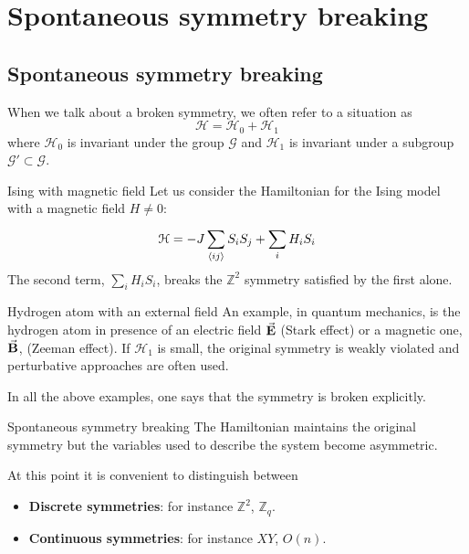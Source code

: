 \documentclass[../../Main/Main.tex]{subfiles}
\begin{document}
\chapter{Spontaneous symmetry breaking}

\section{Spontaneous symmetry breaking}

When we talk about a broken symmetry, we often refer to a situation as
\begin{equation*}
  \mathcal{H} = \mathcal{H}_0 + \mathcal{H}_1
\end{equation*}
where \( \mathcal{H}_0 \)  is invariant under the group \( \mathcal{G} \) and \( \mathcal{H}_1 \) is invariant under a subgroup \( \mathcal{G}' \subset  \mathcal{G}\).

\begin{example}{Ising with magnetic field}{}
  Let us consider the Hamiltonian for the Ising model with a magnetic field \( H \neq 0 \):
\begin{equation*}
  \mathcal{H} = -J \sum_{\expval{ij} }^{} S_i S_j + \sum_{i}^{} H_i S_i
\end{equation*}
The second term, \( \sum_{i}^{}  H_i S_i \), breaks the \( \mathbb{Z}^2 \) symmetry satisfied by the first alone.
\end{example}

\begin{example}{Hydrogen atom with an external field}{}
  An example, in quantum mechanics, is the hydrogen atom in presence of an electric field \( \va{E} \) (Stark effect) or a magnetic one, \( \va{B} \), (Zeeman effect). If \( \mathcal{H}_1 \) is small, the original symmetry is weakly violated and perturbative approaches are often used.
\end{example}

In all the above examples, one says that the symmetry is broken explicitly.

\begin{definition}{Spontaneous symmetry breaking}{}
The Hamiltonian maintains the original symmetry but the variables used to describe the system become asymmetric.
\end{definition}

At this point it is convenient to distinguish between
\begin{itemize}
\item \textbf{Discrete symmetries}: for instance \( \mathbb{Z}^2 \), \( \mathbb{Z}_q \).
\item \textbf{Continuous symmetries}: for instance \( XY \), \( O(n) \).
\end{itemize}
\end{document}
